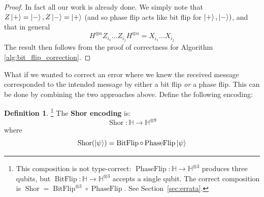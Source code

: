 \documentclass[12pt]{article}
\theoremstyle{plain}
\theoremstyle{definition}
\newtheorem{defn}[thm]{Definition} %
\newcommand{\bb}[1]{\mathbb{#1}}
\newcommand{\lto}{\longrightarrow}
\begin{document}
\begin{proof}
In fact all our work is already done. We simply note that $Z\ket{+} = \ket{-}, Z\ket{-} = \ket{+}$ (and so phase flip acts like bit flip for $\ket{+},\ket{-})$, and that  in general
\begin{equation}
H^{\otimes n}Z_{i_1}\hdots Z_{i_j}H^{\otimes n} = X_{i_1}\hdots X_{i_j}
\end{equation}
The result then follows from the proof of correctness for Algorithm \ref{alg:bit_flip_correction}.
\end{proof}
What if we wanted to correct an error where we knew the received message corresponded to the intended message by either a bit flip \emph{or} a phase flip. This can be done by combining the two approaches above. Define the following encoding:
\begin{defn}\footnote{This composition is not type-correct: $\operatorname{PhaseFlip}:\mathbb{H}\to\mathbb{H}^{\otimes 3}$ produces three qubits, but $\operatorname{BitFlip}:\mathbb{H}\to\mathbb{H}^{\otimes 3}$ accepts a single qubit. The correct composition is $\operatorname{Shor}=\operatorname{BitFlip}^{\otimes 3}\circ\operatorname{PhaseFlip}$. See Section~\ref{sec:errata}.}
The \textbf{Shor encoding} is:
\begin{equation}
\operatorname{Shor}: \bb{H} \lto \bb{H}^{\otimes 9}
\end{equation}
where
\begin{equation}
\operatorname{Shor}(\ket{\psi}) = \operatorname{BitFlip} \circ \operatorname{PhaseFlip}\ket{\psi}
\end{equation}
\end{defn}
\end{document}
